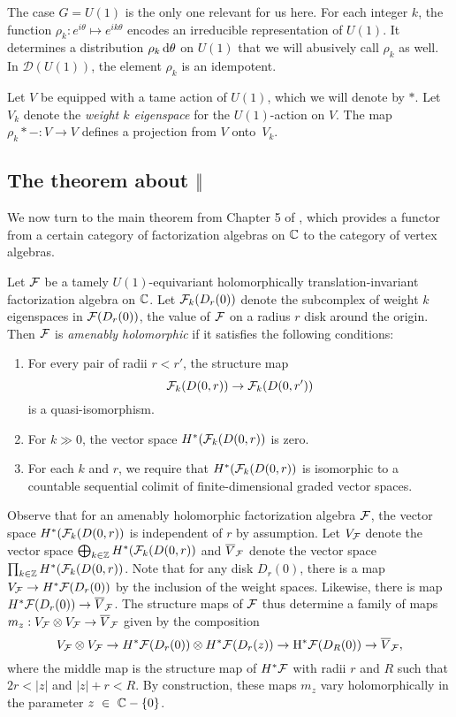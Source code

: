The case $G = U(1)$ is the only one relevant for us here. 
For each integer $k$, the function $\rho_k: e^{i\theta} \mapsto e^{ik\theta}$ encodes an irreducible representation of $U(1)$.
It determines a distribution $\rho_k \, {\rm d} \theta$ on $U(1)$ that we will abusively call $\rho_k$ as well.
In $\mathcal{D}(U(1))$, the element $\rho_k$  is an idempotent.

\begin{dfn}
Let $V$ be equipped with a tame action of $U(1)$, which we will denote by $\ast$. 
Let $V_k$ denote the {\em weight $k$ eigenspace} for the $U(1)$-action on $V$.
The map $\rho_k \ast - : V \to V$ defines a projection from $V$ onto~$V_k$. 
\end{dfn}

\subsection{The theorem about $\Vert$}

We now turn to the main theorem from Chapter 5 of \cite{CG1}, 
which provides a functor from a certain category of factorization algebras on $\mathbb C$ to the category of vertex algebras.

\begin{dfn}
Let $\mathcal F$ be a tamely $U(1)$-equivariant holomorphically translation-invariant factorization algebra on $\mathbb C$.
Let $\mathcal F_k(D_r(0))$ denote the subcomplex of weight $k$ eigenspaces in $\mathcal F(D_r(0))$, 
the value of $\mathcal F$ on a radius $r$ disk around the origin.
Then $\mathcal F$ is {\em amenably holomorphic} if it satisfies the following conditions:
\begin{enumerate}
\item 
For every pair of radii $r < r'$, the structure map
$$
\mathcal F_k(D(0,r)) \to \mathcal F_k(D(0,r'))
$$
is a quasi-isomorphism.
\item For $k \gg 0$, the vector space $H^\ast (\mathcal F_k(D(0,r))$ is zero.  
\item For each $k$ and $r$, we require that $H^\ast(\mathcal F_k(D(0,r) )$ is isomorphic to a countable sequential colimit of finite-dimensional graded vector spaces. 
\end{enumerate}
\end{dfn}

Observe that for an amenably holomorphic factorization algebra $\mathcal F$, 
the vector space $H^* (\mathcal F_k(D(0,r))$ is independent of $r$ by assumption.
Let $V_\mathcal F$ denote the vector space $\bigoplus_{k \in \mathbb Z} H^* (\mathcal F_k(D(0,r))$
and $\overline{V}_\mathcal F$ denote the vector space $\prod_{k \in \mathbb Z} H^* (\mathcal F_k(D(0,r))$.
Note that for any disk $D_r(0)$, there is a map $V_\mathcal F \to H^*\mathcal F(D_r(0))$ by the inclusion of the weight spaces.
Likewise, there is map $H^*\mathcal F(D_r(0)) \to \overline{V}_\mathcal F$.
The structure maps of $\mathcal F$ thus determine a family of maps $m_z: V_\mathcal F \otimes V_\mathcal F \to \overline{V}_\mathcal F$ 
given by the composition
\[
V_\mathcal F \otimes V_\mathcal F \to H^*\mathcal F(D_r(0)) \otimes H^* \mathcal F(D_r(z)) \to {\rm H}^*\mathcal F(D_R(0)) \to \overline{V}_\mathcal F,
\]
where the middle map is the structure map of $H^* \mathcal F$ with radii $r$ and $R$ such that $2r < |z|$ and $|z| + r < R$.
By construction, these maps $m_z$ vary holomorphically in the parameter $z~\in~\mathbb C-\{0\}$.

